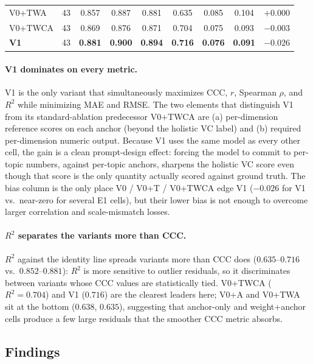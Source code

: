 \begin{table}[t]
\begin{tabular*}{\textwidth}{@{\extracolsep{\fill}}lcccccccc@{}}
    V0+TWA      & 43 & 0.857          & 0.887          & 0.881          & 0.635          & 0.085          & 0.104          & $+0.000$\\
    V0+TWCA     & 43 & 0.869          & 0.876          & 0.871          & 0.704          & 0.075          & 0.093          & $-0.003$\\
    \textbf{V1} & 43 & \textbf{0.881} & \textbf{0.900} & \textbf{0.894} & \textbf{0.716} & \textbf{0.076} & \textbf{0.091} & $-0.026$\\
    \bottomrule
  \end{tabular*}
\end{table}

\paragraph{V1 dominates on every metric.}
V1 is the only variant that simultaneously maximizes CCC, $r$,
Spearman $\rho$, and $R^2$ while minimizing MAE and RMSE. The two
elements that distinguish V1 from its standard-ablation predecessor
V0+TWCA are (a) per-dimension reference scores on each anchor
(beyond the holistic VC label) and (b) required per-dimension
numeric output. Because V1 uses the same model as every other cell,
the gain is a clean prompt-design effect: forcing the model to
commit to per-topic numbers, against per-topic anchors, sharpens
the holistic VC score even though that score is the only quantity
actually scored against ground truth. The bias column is the only
place V0 / V0+T / V0+TWCA edge V1 ($-0.026$ for V1 vs.\ near-zero
for several E1 cells), but their lower bias is not enough to
overcome larger correlation and scale-mismatch losses.

\paragraph{$R^2$ separates the variants more than CCC.}
$R^2$ against the identity line spreads variants more than CCC
does ($0.635$--$0.716$ vs.\ $0.852$--$0.881$): $R^2$ is more
sensitive to outlier residuals, so it discriminates between
variants whose CCC values are statistically tied. V0+TWCA
($R^2 = 0.704$) and V1 ($0.716$) are the clearest leaders here;
V0+A and V0+TWA sit at the bottom ($0.638$, $0.635$), suggesting
that anchor-only and weight+anchor cells produce a few large
residuals that the smoother CCC metric absorbs.

\subsection{Findings}
\label{app:vc-findings}

